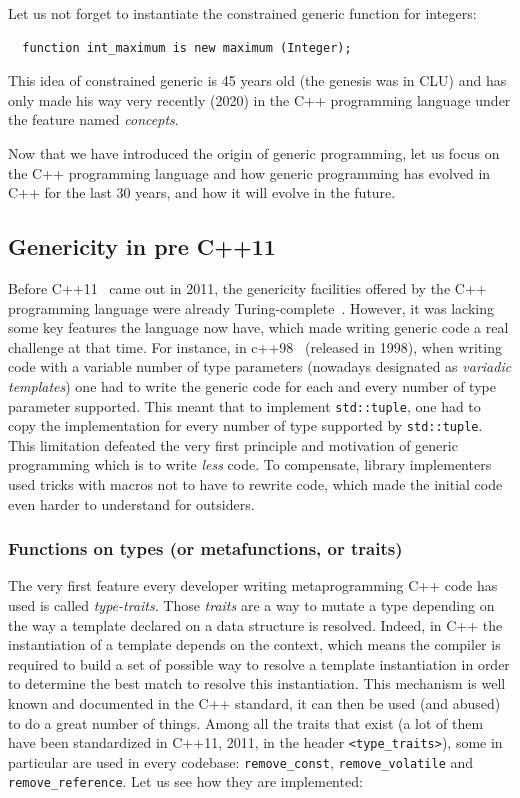 Let us not forget to instantiate the constrained generic function for integers:

\begin{verbatim}
  function int_maximum is new maximum (Integer);
\end{verbatim}

This idea of constrained generic is 45 years old (the genesis was in CLU) and has only made his way very recently (2020)
in the C++ programming language under the feature named \emph{concepts}.

Now that we have introduced the origin of generic programming, let us focus on the C++ programming language and how
generic programming has evolved in C++ for the last 30 years, and how it will evolve in the future.

\subsection{Genericity in pre C++11}
\label{sec:precpp11}

Before C++11~\parencite{iso.2011.cpp} came out in 2011, the genericity facilities offered by the C++ programming
language were already Turing-complete~\parencite{veldhuizen.2003.c++templates}. However, it was lacking some key
features the language now have, which made writing generic code a real challenge at that time. For instance, in
c++98~\parencite{iso.1998.cpp} (released in 1998), when writing code with a variable number of type parameters (nowadays
designated as \emph{variadic templates}) one had to write the generic code for each and every number of type parameter
supported. This meant that to implement \texttt{std::tuple}, one had to copy the implementation for every number of type
supported by \texttt{std::tuple}. This limitation defeated the very first principle and motivation of generic
programming which is to write \emph{less} code. To compensate, library implementers used tricks with macros not to have
to rewrite code, which made the initial code even harder to understand for outsiders.


\subsubsection{Functions on types (or metafunctions, or traits)}

The very first feature every developer writing metaprogramming C++ code has used is called \emph{type-traits}. Those
\emph{traits} are a way to mutate a type depending on the way a template declared on a data structure is resolved.
Indeed, in C++ the instantiation of a template depends on the context, which means the compiler is required to build a
set of possible way to resolve a template instantiation in order to determine the best match to resolve this
instantiation. This mechanism is well known and documented in the C++ standard, it can then be used (and abused) to do a
great number of things. Among all the traits that exist (a lot of them have been standardized in C++11, 2011, in the
header \texttt{<type\_traits>}), some in particular are used in every codebase: \texttt{remove\_const},
\texttt{remove\_volatile} and \texttt{remove\_reference}. Let us see how they are implemented:

